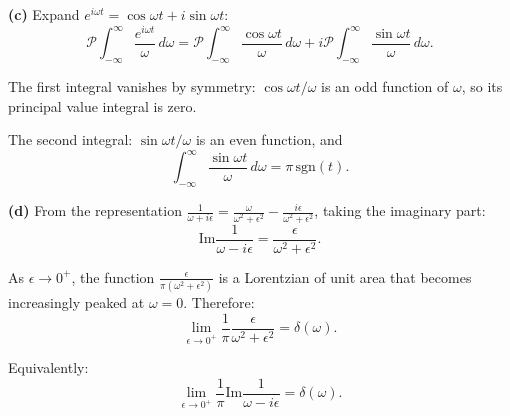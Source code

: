 \documentclass[12pt]{article}
\begin{document}
\textbf{(c)} Expand $e^{i\omega t} = \cos\omega t + i\sin\omega t$:
\[
\mathcal{P}\int_{-\infty}^{\infty}\frac{e^{i\omega t}}{\omega}\,d\omega = \mathcal{P}\int_{-\infty}^{\infty}\frac{\cos\omega t}{\omega}\,d\omega + i\mathcal{P}\int_{-\infty}^{\infty}\frac{\sin\omega t}{\omega}\,d\omega.
\]

The first integral vanishes by symmetry: $\cos\omega t/\omega$ is an odd function of $\omega$, so its principal value integral is zero.

The second integral: $\sin\omega t/\omega$ is an even function, and
\[
\int_{-\infty}^{\infty}\frac{\sin\omega t}{\omega}\,d\omega = \pi\,\text{sgn}(t).
\]

\textbf{(d)} From the representation $\frac{1}{\omega+i\epsilon} = \frac{\omega}{\omega^2+\epsilon^2} - \frac{i\epsilon}{\omega^2+\epsilon^2}$, taking the imaginary part:
\[
\text{Im}\frac{1}{\omega - i\epsilon} = \frac{\epsilon}{\omega^2+\epsilon^2}.
\]

As $\epsilon \to 0^+$, the function $\frac{\epsilon}{\pi(\omega^2+\epsilon^2)}$ is a Lorentzian of unit area that becomes increasingly peaked at $\omega = 0$. Therefore:
\[
\boxed{\lim_{\epsilon\to 0^+}\frac{1}{\pi}\frac{\epsilon}{\omega^2+\epsilon^2} = \delta(\omega).}
\]

Equivalently:
\[
\lim_{\epsilon\to 0^+}\frac{1}{\pi}\text{Im}\frac{1}{\omega-i\epsilon} = \delta(\omega).
\]
\end{document}
